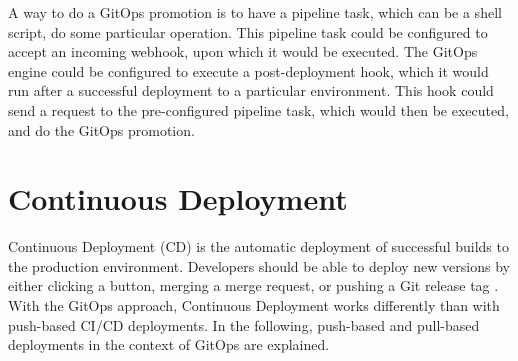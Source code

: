 A way to do a GitOps promotion is to have a pipeline task, which can be a shell script,
do some particular operation. This pipeline task could be configured to accept an incoming webhook,
upon which it would be executed.
The GitOps engine could be configured to execute a post-deployment hook,
which it would run after a successful deployment to a particular environment.
This hook could send a request to the pre-configured pipeline task, which would then be executed,
and do the GitOps promotion.





\vfill

\section{Continuous Deployment}
\label{theoretical-background:gitops-cd}

Continuous Deployment (CD) is the automatic deployment of successful builds to the production environment.
Developers should be able to deploy new versions by either clicking a button, merging a merge request, or pushing a Git release tag
\autocite{cloudNativeDevopsMitKubernetesArundel2019cloud}.
With the GitOps approach,
Continuous Deployment works differently than with push-based CI/CD deployments.
In the following,
push-based and pull-based deployments in the context of GitOps are explained.

